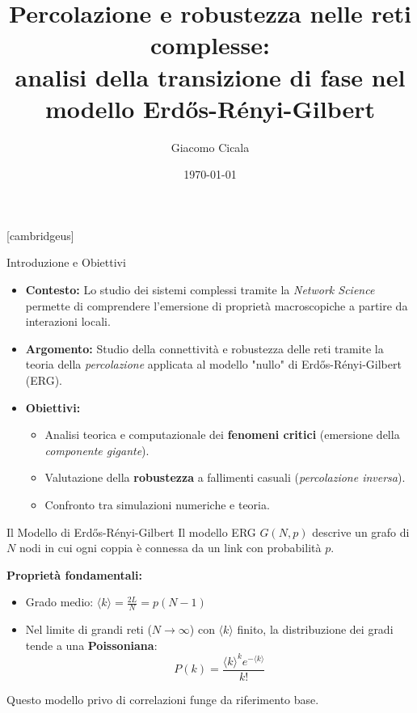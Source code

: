 \documentclass[italian]{beamer}
\title[Percolazione e Robustezza]{Percolazione e robustezza nelle reti complesse:\\ \large analisi della transizione di fase nel modello Erdős-Rényi-Gilbert}
\author{Giacomo Cicala}
\institute[]{Corso di laurea triennale in Fisica}
\date{\today}
\begin{document}
{
\maketitle
}
[cambridgeus]

\begin{frame}{Introduzione e Obiettivi}
    \begin{itemize}
        \item \textbf{Contesto:} Lo studio dei sistemi complessi tramite la \emph{Network Science} permette di comprendere l'emersione di proprietà macroscopiche a partire da interazioni locali.
        \item \textbf{Argomento:} Studio della connettività e robustezza delle reti tramite la teoria della \emph{percolazione} applicata al modello "nullo" di Erdős-Rényi-Gilbert (ERG).
        \item \textbf{Obiettivi:}
              \begin{itemize}
                  \item Analisi teorica e computazionale dei \textbf{fenomeni critici} (emersione della \emph{componente gigante}).
                  \item Valutazione della \textbf{robustezza} a fallimenti casuali (\emph{percolazione inversa}).
                  \item Confronto tra simulazioni numeriche e teoria.
              \end{itemize}
    \end{itemize}
\end{frame}

\begin{frame}{Il Modello di Erdős-Rényi-Gilbert}
    Il modello ERG $G(N, p)$ descrive un grafo di $N$ nodi in cui ogni coppia è connessa da un link con probabilità $p$.

    \vspace{0.5cm}
    \textbf{Proprietà fondamentali:}
    \begin{itemize}
        \item Grado medio: $\langle k \rangle = \frac{2L}{N} = p(N-1)$
        \item Nel limite di grandi reti ($N \to \infty$) con $\langle k \rangle$ finito, la distribuzione dei gradi tende a una \textbf{Poissoniana}:
              \begin{equation*}
                  P(k) = \frac{\langle k \rangle^k e^{-\langle k \rangle}}{k!}
              \end{equation*}
    \end{itemize}
    Questo modello privo di correlazioni funge da riferimento base.
\end{frame}
\end{document}
